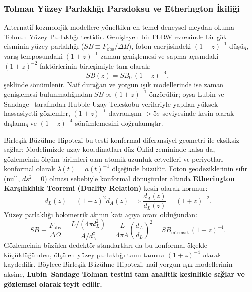 \subsubsection{Tolman Yüzey Parlaklığı Paradoksu ve Etherington İkiliği}
\label{sec:tolman_ve_etherington}
Alternatif kozmolojik modellere yöneltilen en temel deneysel meydan okuma Tolman Yüzey Parlaklığı testidir. Genişleyen bir FLRW evreninde bir gök cisminin yüzey parlaklığı ($SB \equiv F_{\mathrm{obs}} / \Delta \Omega$), foton enerjisindeki $(1+z)^{-1}$ düşüş, varış temposundaki $(1+z)^{-1}$ zaman genişlemesi ve sapma açısındaki $(1+z)^{-2}$ faktörlerinin birleşimiyle tam olarak:
\begin{equation}
    SB(z) = SB_0 \, (1+z)^{-4},
    \label{eq:tolman_standart_ispat}
\end{equation}
şeklinde sönümlenir. Naif durağan ve yorgun ışık modellerinde ise zaman genişlemesi bulunmadığından $SB \propto (1+z)^{-1}$ öngörülür; oysa Lubin ve Sandage~\cite{wetterich2013} tarafından Hubble Uzay Teleskobu verileriyle yapılan yüksek hassasiyetli gözlemler, $(1+z)^{-1}$ davranışını $>5\sigma$ seviyesinde kesin olarak dışlamış ve $(1+z)^{-4}$ sönümlemesini doğrulamıştır.

Birleşik Büzülme Hipotezi bu testi konformal diferansiyel geometri ile eksiksiz sağlar:
Modelimizde uzay koordinatları düz Öklid zemininde kalsa da, gözlemcinin ölçüm birimleri olan atomik uzunluk cetvelleri ve periyotları konformal olarak $\lambda(t) = a(t)^{-1}$ ölçeğinde büzülür. Foton geodeziklerinin sıfır (null, $ds^2 = 0$) olması sebebiyle konformal dönüşümler altında \textbf{Etherington Karşılıklılık Teoremi (Duality Relation)} kesin olarak korunur:
\begin{equation}
    d_L(z) = (1+z)^2 d_A(z) \implies \frac{d_A(z)}{d_L(z)} = (1+z)^{-2}.
    \label{eq:etherington_korunumu}
\end{equation}
Yüzey parlaklığı bolometrik akının katı açıya oranı olduğundan:
\begin{equation}
    SB \equiv \frac{F_{\mathrm{obs}}}{\Delta \Omega} = \frac{L / (4\pi d_L^2)}{A / d_A^2} = \frac{L}{4\pi A} \left( \frac{d_A}{d_L} \right)^2 = SB_{\mathrm{intrinsik}} \, (1+z)^{-4}.
    \label{eq:tolman_buzulme_tam}
\end{equation}
Gözlemcinin büzülen dedektör standartları da bu konformal ölçekle küçüldüğünden, ölçülen yüzey parlaklığı tamı tamına $(1+z)^{-4}$ olarak kaydedilir. Böylece Birleşik Büzülme Hipotezi, naif yorgun ışık modellerinin aksine, \textbf{Lubin--Sandage Tolman testini tam analitik kesinlikle sağlar ve gözlemsel olarak teyit edilir.}

